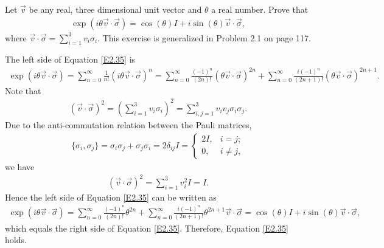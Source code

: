 \documentclass[en]{sol-man}
\begin{document}
\begin{exe}
    Let $\vec{v}$ be any real, three dimensional unit vector and $\theta$ a real number. Prove that
    \begin{align}
        \label{E2.35}
        \exp(i\theta\vec{v}\cdot\vec{\sigma})=\cos(\theta)I+i\sin(\theta)\vec{v}\cdot\vec{\sigma},
    \end{align}
    where $\vec{v}\cdot\vec{\sigma}=\sum_{i=1}^3v_i\sigma_i$. This exercise is generalized in Problem 2.1 on page 117.
\end{exe}
\begin{pf}
    The left side of Equation \eqref{E2.35} is
    \begin{align}
        \exp(i\theta\vec{v}\cdot\vec{\sigma})=\sum_{n=0}^{\infty}\frac{1}{n!}(i\theta\vec{v}\cdot\vec{\sigma})^n=\sum_{n=0}^{\infty}\frac{(-1)^n}{(2n)!}(\theta\vec{v}\cdot\vec{\sigma})^{2n}+\sum_{n=0}^{\infty}\frac{i(-1)^n}{(2n+1)!}(\theta\vec{v}\cdot\vec{\sigma})^{2n+1}.
    \end{align}
    Note that
    \begin{align}
        (\vec{v}\cdot\vec{\sigma})^2=\left(\sum_{i=1}^3v_i\sigma_i\right)^2=\sum_{i,j=1}^3v_iv_j\sigma_i\sigma_j.
    \end{align}
    Due to the anti-commutation relation between the Pauli matrices,
    \begin{align}
        \{\sigma_i,\sigma_j\}=\sigma_i\sigma_j+\sigma_j\sigma_i=2\delta_{ij}I=\left\{\begin{array}{ll}
            2I,&i=j;\\
            0,&i\neq j,
        \end{array}\right.
    \end{align}
    we have
    \begin{align}
        (\vec{v}\cdot\vec{\sigma})^2=\sum_{i=1}^3v_i^2I=I.
    \end{align}
    Hence the left side of Equation \eqref{E2.35} can be written as
    \begin{align}
        \exp(i\theta\vec{v}\cdot\vec{\sigma})=\sum_{n=0}^{\infty}\frac{(-1)^n}{(2n)!}\theta^{2n}+\sum_{n=0}^{\infty}\frac{i(-1)^n}{(2n+1)!}\theta^{2n+1}\vec{v}\cdot\vec{\sigma}=\cos(\theta)I+i\sin(\theta)\vec{v}\cdot\vec{\sigma},
    \end{align}
    which equals the right side of Equation \eqref{E2.35}. Therefore, Equation \eqref{E2.35} holds.
\end{pf}
\end{document}

